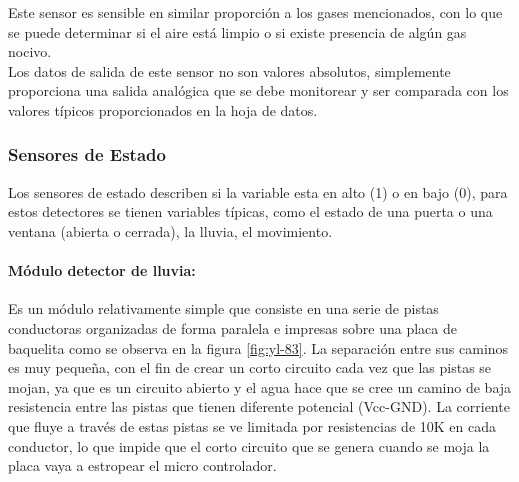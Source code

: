 
Este sensor es sensible en similar proporción a los gases mencionados, con lo que se puede determinar si el aire está limpio o si existe presencia de algún gas nocivo.\\

Los datos de salida de este sensor no son valores absolutos, simplemente proporciona una salida analógica que se debe monitorear y ser comparada con los valores típicos proporcionados en la hoja de datos.\cite{MQ2}

\subsubsection{Sensores de Estado}

Los sensores de estado describen si la variable esta en alto (1) o en bajo (0), para estos detectores se tienen variables típicas, como el estado de una puerta o una ventana (abierta o cerrada), la lluvia, el movimiento.

\paragraph{Módulo detector de lluvia: }

Es un módulo relativamente simple que consiste en una serie de pistas conductoras organizadas de forma paralela e impresas sobre una placa de baquelita como se observa en la figura \ref{fig:yl-83}. La separación entre sus caminos es muy pequeña, con el fin de crear un corto circuito cada vez que las pistas se mojan, ya que es un circuito abierto y el agua hace que se cree un camino de baja resistencia entre las pistas que tienen diferente potencial (Vcc-GND). La corriente que fluye a través de estas pistas se ve limitada por resistencias de 10K en cada conductor, lo que impide que el corto circuito que se genera cuando se moja la placa vaya a estropear el micro controlador.\cite{LLU}


